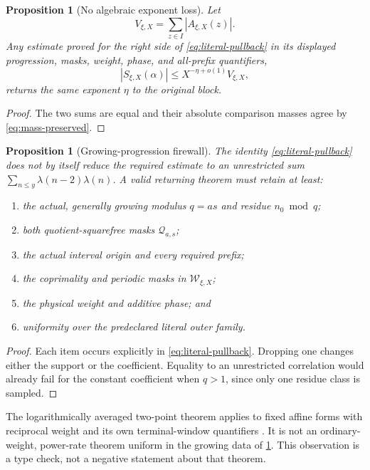 \documentclass[11pt]{article}
\newtheorem{proposition}[theorem]{Proposition}
\theoremstyle{definition}
\theoremstyle{remark}
\begin{document}
\begin{proposition}[No algebraic exponent loss]
\label{prop:no-loss}
Let
\[
 V_{\xi,X}=\sum_{z\in I}|A_{\xi,X}(z)|.
\]
Any estimate proved for the right side of
\eqref{eq:literal-pullback} in its displayed progression, masks,
weight, phase, and all-prefix quantifiers,
\[
 |S_{\xi,X}(\alpha)|
 \le X^{-\eta+o(1)}V_{\xi,X},
\]
returns the same exponent \(\eta\) to the original block.
\end{proposition}

\begin{proof}
The two sums are equal and their absolute comparison masses agree
by \eqref{eq:mass-preserved}.
\end{proof}

\begin{proposition}[Growing-progression firewall]
\label{prop:firewall}
The identity \eqref{eq:literal-pullback} does not by itself reduce
the required estimate to an unrestricted sum
\(\sum_{n\le y}\lambda(n-2)\lambda(n)\).  A valid returning theorem
must retain at least:
\begin{enumerate}[label=(\alph*),leftmargin=2.2em]
\item the actual, generally growing modulus \(q=as\) and residue
\(n_0\bmod q\);
\item both quotient-squarefree masks \(\mathcal Q_{a,s}\);
\item the actual interval origin and every required prefix;
\item the coprimality and periodic masks in \(\mathcal W_{\xi,X}\);
\item the physical weight and additive phase; and
\item uniformity over the predeclared literal outer family.
\end{enumerate}
\end{proposition}

\begin{proof}
Each item occurs explicitly in \eqref{eq:literal-pullback}.  Dropping
one changes either the support or the coefficient.  Equality to an
unrestricted correlation would already fail for the constant
coefficient when \(q>1\), since only one residue class is sampled.
\end{proof}

The logarithmically averaged two-point theorem applies to fixed
affine forms with reciprocal weight and its own terminal-window
quantifiers \citep{Tao2016LogChowla}.  It is not an
ordinary-weight, power-rate theorem uniform in the growing data of
\cref{prop:firewall}.  This observation is a type check, not a
negative statement about that theorem.
\end{document}
